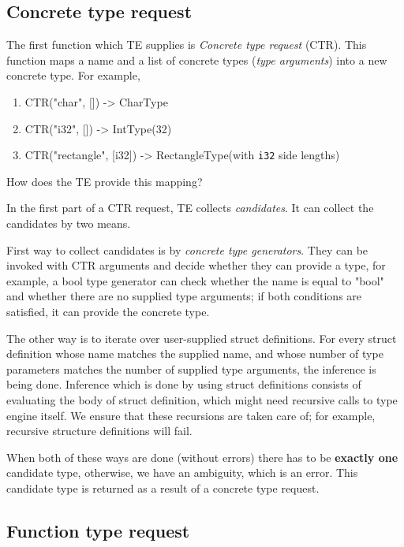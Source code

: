 \documentclass[times, utf8, diplomski]{fer}
\theoremstyle{definition}
\begin{document}
\subsection{Concrete type request}

The first function which TE supplies is \textit{Concrete type request} (CTR). This function maps
a name and a list of concrete types (\textit{type arguments}) into a new concrete type. For example,

\begin{enumerate}
    \item CTR("char", []) -> CharType
    \item CTR("i32", []) -> IntType(32)
    \item CTR("rectangle", [i32]) -> RectangleType(with \texttt{i32} side lengths)
\end{enumerate}

How does the TE provide this mapping? 

In the first part of a CTR request, TE collects \textit{candidates}.
It can collect the candidates by two means.

First way to collect candidates is by \textit{concrete type generators}.
They can be invoked with CTR arguments and decide whether they can provide a type, for example,
a bool type generator can check whether the name is equal to "bool" and whether 
there are no supplied type arguments; if both conditions are satisfied,
it can provide the concrete type.

The other way is to iterate over user-supplied struct definitions.
For every struct definition whose name matches the supplied name, 
and whose number of type parameters matches the number of supplied type arguments,
the inference is being done. Inference which is done by 
using struct definitions consists of evaluating the body of struct definition,
which might need recursive calls to type engine itself. We ensure that these
recursions are taken care of; for example, recursive structure definitions will fail.

When both of these ways are done (without errors) there has to be \textbf{exactly one} candidate type,
otherwise, we have an ambiguity, which is an error. This candidate type is returned as a result
of a concrete type request.

\subsection{Function type request}
\end{document}
